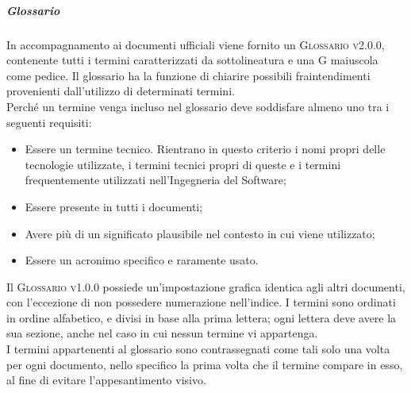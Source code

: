 \documentclass[../norme-di-progetto.tex]{subfiles}
\begin{document}
\subparagraph*{Glossario}
In accompagnamento ai documenti ufficiali viene fornito un \textsc{Glossario v2.0.0}, contenente tutti i termini caratterizzati da sottolineatura e una G maiuscola come pedice. Il glossario ha la funzione di chiarire possibili fraintendimenti provenienti dall'utilizzo di determinati termini. \\
Perché un termine venga incluso nel glossario deve soddisfare almeno uno tra i seguenti requisiti:
\begin{itemize}
  \item Essere un termine tecnico. Rientrano in questo criterio i nomi propri delle tecnologie utilizzate, i termini tecnici propri di queste e i termini frequentemente utilizzati nell'Ingegneria del Software;
  \item Essere presente in tutti i documenti;
  \item Avere più di un significato plausibile nel contesto in cui viene utilizzato;
  \item Essere un acronimo specifico e raramente usato.
\end{itemize}
Il \textsc{Glossario v1.0.0} possiede un'impostazione grafica identica agli altri documenti, con l'eccezione di non possedere numerazione nell'indice. I termini sono ordinati in ordine alfabetico, e divisi in base alla prima lettera; ogni lettera deve avere la sua sezione, anche nel caso in cui nessun termine vi appartenga. \\
I termini appartenenti al glossario sono contrassegnati come tali solo una volta per ogni documento, nello specifico la prima volta che il termine compare in esso, al fine di evitare l'appesantimento visivo.
\end{document}
